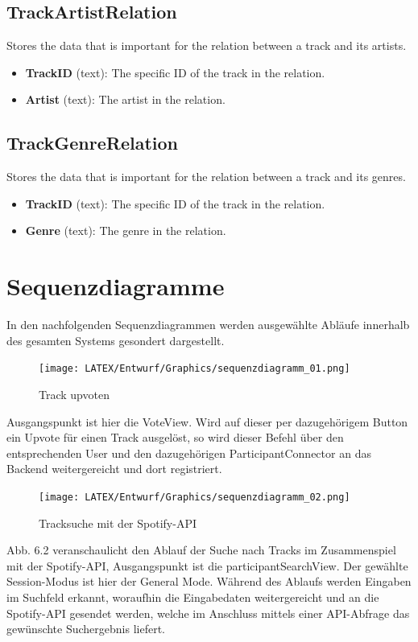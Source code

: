 \documentclass[oneside, ngerman]{sdqtechreport}
\begin{document}
\section{TrackArtistRelation}

Stores the data that is important for the relation between a track and its artists.

\begin{itemize}
    \item \textbf{TrackID} (text): The specific ID of the track in the relation.
    \item \textbf{Artist} (text): The artist in the relation.
\end{itemize}

\section{TrackGenreRelation}

Stores the data that is important for the relation between a track and its genres.

\begin{itemize}
    \item \textbf{TrackID} (text): The specific ID of the track in the relation.
    \item \textbf{Genre} (text): The genre in the relation.
\end{itemize}

\chapter{Sequenzdiagramme}
\label{chap:Sequenzdiagramme}

In den nachfolgenden Sequenzdiagrammen werden ausgewählte Abläufe innerhalb des gesamten Systems gesondert dargestellt.
\vspace{1cm}

\begin{figure}[h]
    \texttt{[image: LATEX/Entwurf/Graphics/sequenzdiagramm\_01.png]}
    \caption{Track upvoten}
    \label{fig:sequenzdiagramm01}
\end{figure}

\vspace{1cm}
Ausgangspunkt ist hier die VoteView. Wird auf dieser per dazugehörigem Button ein Upvote für einen Track ausgelöst, so wird dieser Befehl über den entsprechenden User und den dazugehörigen ParticipantConnector an das Backend weitergereicht und dort registriert. 



\begin{figure}[h]
    \texttt{[image: LATEX/Entwurf/Graphics/sequenzdiagramm\_02.png]}
    \caption{Tracksuche mit der Spotify-API}
    \label{fig:sequenzdiagramm02}
\end{figure}

\vspace{6cm}
Abb. 6.2 veranschaulicht den Ablauf der Suche nach Tracks im Zusammenspiel mit der Spotify-API, Ausgangspunkt ist die participantSearchView. Der gewählte Session-Modus ist hier der General Mode. Während des Ablaufs werden Eingaben im Suchfeld erkannt, woraufhin die Eingabedaten weitergereicht und an die Spotify-API gesendet werden, welche im Anschluss mittels einer API-Abfrage das gewünschte Suchergebnis liefert.
\end{document}
